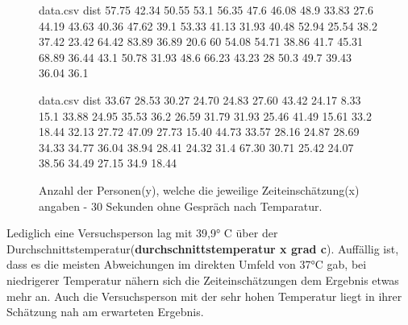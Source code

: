 \documentclass{Paper}
\begin{document}
\begin{figure}[H]
\begin{filecontents}{data.csv}
dist
  57.75
 42.34
 50.55
 53.1
 56.35
 47.6
 46.08
 48.9
 33.83
 27.6
 44.19
 43.63
 40.36
 47.62
 39.1
 53.33
 41.13
 31.93
 40.48
 52.94
25.54
 38.2
37.42
23.42
 64.42
 83.89
36.89
20.6
 60
 54.08 
 54.71
 38.86
 41.7
 45.31
 68.89
36.44
 43.1
50.78
31.93
48.6
66.23
 43.23
 28
 50.3
 49.7
 39.43
 36.04
36.1
\end{filecontents}
\begin{minipage}[t]{0.49\linewidth}
\caption{Anzahl der Personen(y), welche die jeweilige Zeiteinschätzung(x) angaben - 40 Sekunden ohne Gespräch nach Temperatur.}
\label{HistZeit40sekTemp}
\end{minipage}
\hfill
\begin{filecontents}{data.csv}
dist
  33.67
 28.53
 30.27
 24.70
 24.83
 27.60
 43.42
 24.17
 8.33
 15.1
 33.88
 24.95
 35.53
 36.2
 26.59
 31.79
 31.93
 25.46
 41.49
 15.61
 33.2
 18.44
 32.13
 27.72
 47.09
 27.73
 15.40
 44.73
 33.57
 28.16 
 24.87
 28.69
 34.33
 34.77
 36.04
 38.94
 28.41
 24.32
 31.4
 67.30
 30.71
 25.42
 24.07
 38.56
 34.49
 27.15 
 34.9
18.44
\end{filecontents}
\begin{minipage}[t]{0.49\linewidth}
\caption{Anzahl der Personen(y), welche die jeweilige Zeiteinschätzung(x) angaben - 30 Sekunden ohne Gespräch nach Temparatur.}
\label{HistZeit30sekTemp}
\end{minipage}
\end{figure}


Lediglich eine Versuchsperson lag mit 39,9° C über der Durchschnittstemperatur(\textbf{durchschnittstemperatur x grad c}). Auffällig ist, dass es die meisten Abweichungen im direkten Umfeld von 37°C gab, bei niedrigerer Temperatur nähern sich die Zeiteinschätzungen dem Ergebnis etwas mehr an. Auch die Versuchsperson mit der sehr hohen Temperatur liegt in ihrer Schätzung nah am erwarteten Ergebnis.
\end{document}
